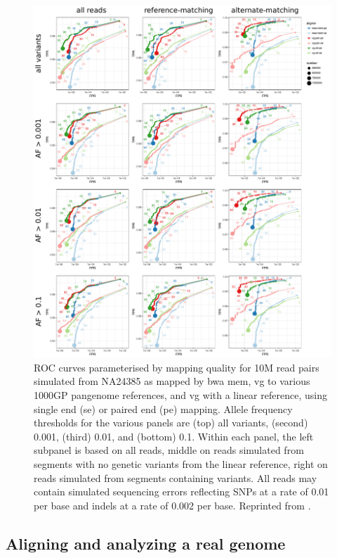 \begin{figure}[htbp!] 
\centering    
\includegraphics[width=1.0\textwidth]{Chapter3/Figs/human-10M-results-7358a67_merge_panel_labeled.pdf}
\caption[Simulated reads from HG002 versus various human pangenome graphs.]{
  ROC curves parameterised by mapping quality for 10M read pairs simulated from NA24385 as mapped by bwa mem, vg to various 1000GP pangenome references, and vg with a linear reference, using single end (se) or paired end (pe) mapping.
  Allele frequency thresholds for the various panels are (top) all variants, (second) 0.001, (third) 0.01, and (bottom) 0.1.
  Within each panel, the left subpanel is based on all reads, middle on reads simulated from segments with no genetic variants from the linear reference, right on reads simulated from segments containing variants.
  All reads may contain simulated sequencing errors reflecting SNPs at a rate of 0.01 per base and indels at a rate of 0.002 per base.
  Reprinted from \cite{garrison2018variation}.}
\label{fig:HG002_1000GP_sim}
\end{figure}

\subsection{Aligning and analyzing a real genome}


